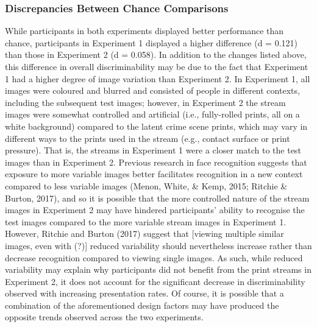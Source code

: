 \documentclass[
  english,
  man]{apa6}
\begin{document}
\hypertarget{discrepancies-between-chance-comparisons}{%
\subsubsection{Discrepancies Between Chance Comparisons}\label{discrepancies-between-chance-comparisons}}

While participants in both experiments displayed better performance than chance, participants in Experiment 1 displayed a higher difference (d = 0.121) than those in Experiment 2 (d = 0.058). In addition to the changes listed above, this difference in overall discriminability may be due to the fact that Experiment 1 had a higher degree of image variation than Experiment 2. In Experiment 1, all images were coloured and blurred and consisted of people in different contexts, including the subsequent test images; however, in Experiment 2 the stream images were somewhat controlled and artificial (i.e., fully-rolled prints, all on a white background) compared to the latent crime scene prints, which may vary in different ways to the prints used in the stream (e.g., contact surface or print pressure). That is, the streams in Experiment 1 were a closer match to the test images than in Experiment 2. Previous research in face recognition suggests that exposure to more variable images better facilitates recognition in a new context compared to less variable images (Menon, White, \& Kemp, 2015; Ritchie \& Burton, 2017), and so it is possible that the more controlled nature of the stream images in Experiment 2 may have hindered participants' ability to recognise the test images compared to the more variable stream images in Experiment 1. However, Ritchie and Burton (2017) suggest that {[}viewing multiple similar images, even with (?){]} reduced variability should nevertheless increase rather than decrease recognition compared to viewing single images. As such, while reduced variability may explain why participants did not benefit from the print streams in Experiment 2, it does not account for the significant decrease in discriminability observed with increasing presentation rates. Of course, it is possible that a combination of the aforementioned design factors may have produced the opposite trends observed across the two experiments.
\end{document}
